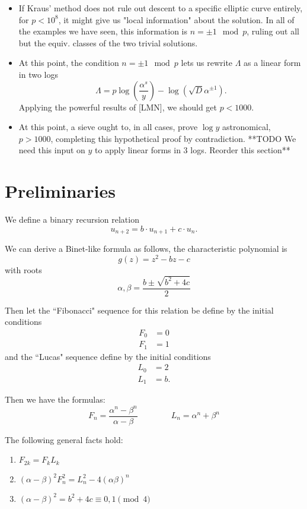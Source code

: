 \documentclass[12pt]{article}
\begin{document}
\begin{enumerate}
\begin{itemize}
\item If Kraus' method does not rule out descent to a specific elliptic curve entirely, for $p < 10^8$, it might give us "local information" about the solution. In all of the examples we have seen, this information is $n = \pm 1 \mod p$, ruling out all but the equiv. classes of the two trivial solutions.
\item At this point, the condition $n = \pm 1 \mod p$ lets us rewrite $\Lambda$ as a linear form in two logs 
\[ \Lambda = p \log(\frac{\alpha^s}{y}) -  \log(\sqrt{D}\alpha^{\pm 1}). \]
Applying the powerful results of [LMN], we should get $p < 1000$.

\item At this point, a sieve ought to, in all cases, prove $\log y$ astronomical, $p > 1000$, completing this hypothetical proof by contradiction. **TODO We need this input on $y$ to apply linear forms in 3 logs. Reorder this section**

\end{itemize}
\end{enumerate}


\section{Preliminaries}

We define a binary recursion relation
\[ u_{n+2} = b\cdot u_{n+1}+ c\cdot u_n. \]

We can derive a Binet-like formula as follows, the characteristic polynomial is
\[ g(z) = z^2 - bz - c\]
with roots
\[ \alpha, \beta = \frac{b \pm \sqrt{b^2+4c}}{2} \]

Then let the ``Fibonacci" sequence for this relation be define by the initial conditions
\begin{align*}
F_0 &= 0 \\
F_1 & = 1 
\end{align*}
and the ``Lucas" sequence define by the initial conditions
\begin{align*}
L_0 &= 2 \\
L_1 & = b. 
\end{align*}

Then we have the formulas:
\[F_n = \frac{\alpha^n - \beta^n}{\alpha - \beta} \qquad \qquad L_n = \alpha^n +\beta^n \]

The following general facts hold:

\begin{enumerate}

\item $F_{2k} = F_kL_k$

\item $(\alpha - \beta)^2F_n^2 = L_n^2 - 4(\alpha\beta)^n$

\item $(\alpha - \beta)^2 = b^2+4c \equiv 0,1 \pmod{4}$

\end{enumerate}
\end{document}
